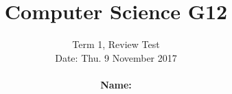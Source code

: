 \documentclass{article}
\begin{document}
\title{Computer Science G12}
\author{Term 1, Review Test \\Date: Thu. 9 November 2017 \\  \\{\bf Name:}\\ }
\date{}
\maketitle


\end{document}
